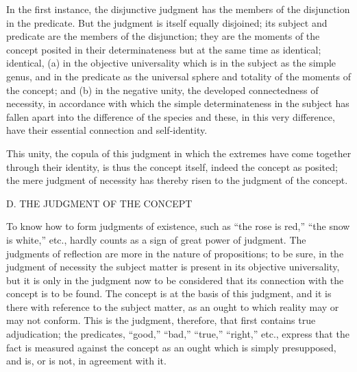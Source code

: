 In the first instance, the disjunctive judgment has
the members of the disjunction in the predicate.
But the judgment is itself equally disjoined;
its subject and predicate are the members of the disjunction;
they are the moments of the concept
posited in their determinateness
but at the same time as identical;
identical, (a) in the objective universality
which is in the subject as the simple genus,
and in the predicate as the universal sphere
and totality of the moments of the concept;
and (b) in the negative unity,
the developed connectedness of necessity,
in accordance with which the simple determinateness
in the subject has fallen apart
into the difference of the species
and these, in this very difference,
have their essential connection and self-identity.

This unity, the copula of this judgment
in which the extremes have come together
through their identity,
is thus the concept itself,
indeed the concept as posited;
the mere judgment of necessity has
thereby risen to the judgment of the concept.

D. THE JUDGMENT OF THE CONCEPT

To know how to form judgments of existence,
such as “the rose is red,” “the snow is white,” etc.,
hardly counts as a sign of great power of judgment.
The judgments of reflection are more in the nature of propositions;
to be sure, in the judgment of necessity
the subject matter is present in its objective universality,
but it is only in the judgment now to be considered
that its connection with the concept is to be found.
The concept is at the basis of this judgment,
and it is there with reference to the subject matter,
as an ought to which reality may or may not conform.
This is the judgment, therefore, that first contains true adjudication;
the predicates, “good,” “bad,” “true,” “right,” etc.,
express that the fact is measured against the concept
as an ought which is simply presupposed,
and is, or is not, in agreement with it.

